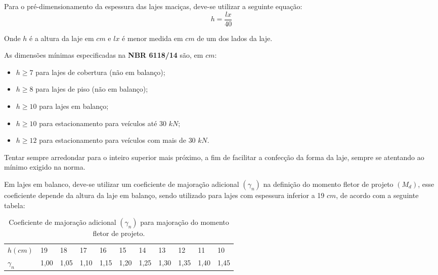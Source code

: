 Para o pré-dimensionamento da espessura das lajes maciças, deve-se utilizar a seguinte equação: $$h = \frac{lx}{40}$$ 

Onde $h$ é a altura da laje em $cm$ e $lx$ é menor medida em $cm$ de um dos lados da laje.

As dimensões mínimas especificadas na \textbf{NBR 6118/14} são, em $cm$:

\begin{itemize}
	\item $h \geqslant 7$ para lajes de cobertura (não em balanço);
	\item $h \geqslant 8$ para lajes de piso (não em balanço);
	\item $h \geqslant 10$ para lajes em balanço;
	\item $h \geqslant 10$ para estacionamento para veículos até $30$ $kN$;
	\item $h \geqslant 12$ para estacionamento para veículos com mais de $30$ $kN$.
\end{itemize}

Tentar sempre arredondar para o inteiro superior mais próximo, a fim de facilitar a confecção da forma da laje, sempre se atentando ao mínimo exigido na norma.

Em lajes em balanco, deve-se utilizar um coeficiente de majoração adicional $(\gamma_n)$ na definição do momento fletor de projeto $(M_d)$, esse coeficiente depende da altura da laje em balanço, sendo utilizado para lajes com espessura inferior a 19 $cm$, de acordo com a seguinte tabela:

\begin{table}[H]
	\begin{center}
	\begin{tabular}{l|llllllllll}
	\hline
		$h (cm)$   & 19   & 18   & 17   & 16   & 15   & 14   & 13   & 12   & 11   & 10   \\
		$\gamma_n$ & 1,00 & 1,05 & 1,10 & 1,15 & 1,20 & 1,25 & 1,30 & 1,35 & 1,40 & 1,45 \\ \hline
	\end{tabular}


	\caption{Coeficiente de majoração adicional $(\gamma_n)$ para majoração do momento fletor de projeto.}
	\end{center}
\end{table}